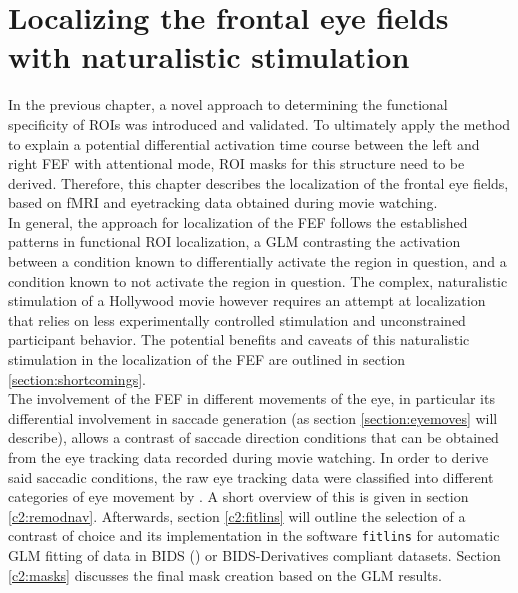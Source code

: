 \documentclass[a4paper, 12pt]{scrreprt}
\begin{document}
\chapter{Localizing the frontal eye fields with naturalistic stimulation}\label{c2}

In the previous chapter, a novel approach to determining the functional specificity of ROIs was introduced and validated. To ultimately apply the method to explain a potential differential activation time course between the left and right FEF with attentional mode, ROI masks for this structure need to be derived. Therefore, this chapter describes the localization of the frontal eye fields, based on fMRI and eyetracking data obtained during movie watching. \\
In general, the approach for localization of the FEF follows the established patterns in functional ROI localization, a GLM contrasting the activation between a condition known to differentially activate the region in question, and a condition known to not activate the region in question. The complex, naturalistic stimulation of a Hollywood movie however requires an attempt at localization that relies on less experimentally controlled stimulation and unconstrained participant behavior. The potential benefits and caveats of this naturalistic stimulation in the localization of the FEF are outlined in section \ref{section:shortcomings}. \\ 
The involvement of the FEF in different movements of the eye, in particular its differential involvement in saccade generation (as section \ref{section:eyemoves} will describe), allows a contrast of saccade direction conditions that can be obtained from the eye tracking data recorded during movie watching. In order to derive said saccadic conditions, the raw eye tracking data were classified into different categories of eye movement by \textcite{dar2019}. A short overview of this is given in section \ref{c2:remodnav}. Afterwards, section \ref{c2:fitlins} will outline the selection of a contrast of choice and its implementation in the software \texttt{fitlins} for automatic GLM fitting of data in BIDS (\cite{gorgolewski2016brain}) or BIDS-Derivatives compliant datasets. Section \ref{c2:masks} discusses the final mask creation based on the GLM results.
\end{document}

